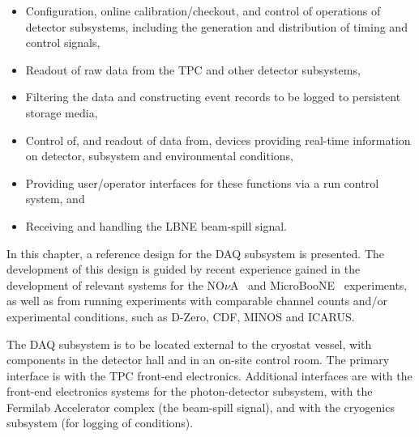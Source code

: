 \begin{itemize}
  \item Configuration, online calibration/checkout, and control of 
        operations of detector subsystems, including the generation 
        and distribution of timing and control signals,

  \item Readout of raw data from the TPC and other detector subsystems,  

  \item Filtering the data and constructing event records to be 
        logged to persistent storage media, 

  \item Control of, and readout of data from, devices 
        providing real-time information on detector, subsystem 
        and environmental conditions,  

  \item Providing user/operator interfaces for these functions via 
        a run control system, and

  \item Receiving and handling the LBNE beam-spill signal.
\end{itemize}

In this chapter, a reference design for the DAQ subsystem is presented.  
The development of this design is guided by recent experience gained 
in the development of relevant systems for the NO$\nu$A~\cite{novatdr} 
and MicroBooNE~\cite{microboonecdr} experiments, as well as from 
running experiments with comparable channel counts and/or experimental 
conditions, such as D-Zero, CDF, MINOS and ICARUS.


The DAQ subsystem is to be located external to the cryostat vessel, with 
components in the detector hall and in an on-site control room.  The 
primary interface is with the TPC front-end electronics.  Additional 
interfaces are with the front-end electronics systems for the 
photon-detector subsystem, with the Fermilab Accelerator complex 
(the beam-spill signal), and with the cryogenics subsystem (for logging of 
conditions).  


